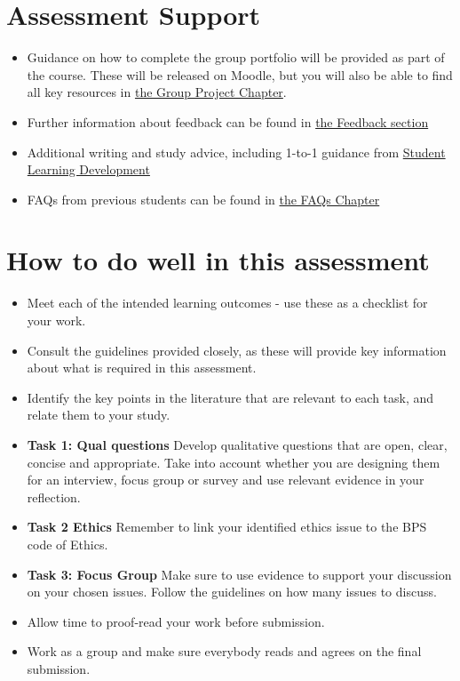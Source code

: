 \documentclass[
  english,
  letterpaper,
  DIV=11,
  numbers=noendperiod]{scrreprt}
\begin{document}
\section{Assessment Support}\label{assessment-support-2}

\begin{itemize}
\item
  Guidance on how to complete the group portfolio will be provided as
  part of the course. These will be released on Moodle, but you will
  also be able to find all key resources in
  \hyperref[ch10_group_project]{the Group Project Chapter}.
\item
  Further information about feedback can be found in
  \hyperref[portfolio_feedback]{the Feedback section}
\item
  Additional writing and study advice, including 1-to-1 guidance from
  \href{https://www.gla.ac.uk/myglasgow/sld/}{Student Learning
  Development}
\item
  FAQs from previous students can be found in \hyperref[ch13_faqs]{the
  FAQs Chapter}
\end{itemize}

\section{How to do well in this
assessment}\label{how-to-do-well-in-this-assessment-2}

\begin{itemize}
\item
  Meet each of the intended learning outcomes - use these as a checklist
  for your work.
\item
  Consult the guidelines provided closely, as these will provide key
  information about what is required in this assessment.
\item
  Identify the key points in the literature that are relevant to each
  task, and relate them to your study.
\item
  \textbf{Task 1: Qual questions} Develop qualitative questions that are
  open, clear, concise and appropriate. Take into account whether you
  are designing them for an interview, focus group or survey and use
  relevant evidence in your reflection.
\item
  \textbf{Task 2 Ethics} Remember to link your identified ethics issue
  to the BPS code of Ethics.
\item
  \textbf{Task 3: Focus Group} Make sure to use evidence to support your
  discussion on your chosen issues. Follow the guidelines on how many
  issues to discuss.
\item
  Allow time to proof-read your work before submission.
\item
  Work as a group and make sure everybody reads and agrees on the final
  submission.
\end{itemize}
\end{document}
